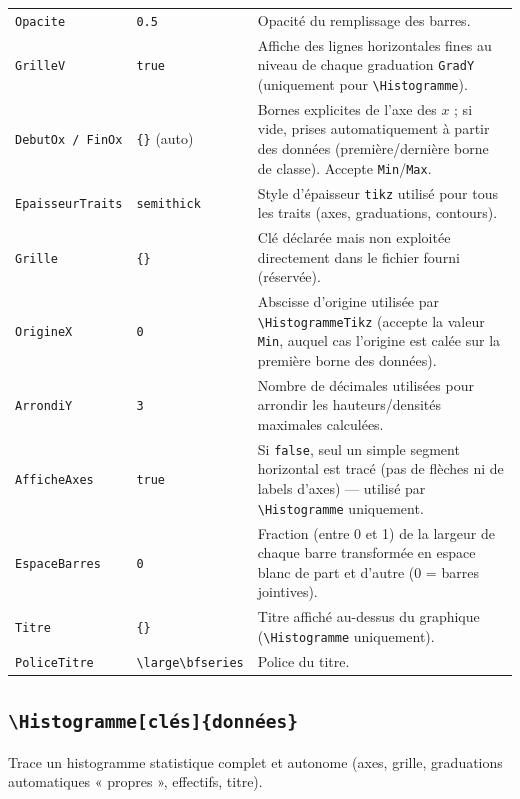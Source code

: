 \documentclass[11pt,a4paper]{article}
\newcommand{\cmdname}[1]{\texttt{\textbackslash#1}}
\begin{document}
\begin{longtable}{@{}p{3.6cm}p{3cm}p{7cm}@{}}
\texttt{Opacite} & \texttt{0.5} & Opacité du remplissage des barres. \\[3pt]
\texttt{GrilleV} & \texttt{true} & Affiche des lignes horizontales fines au niveau de chaque graduation \texttt{GradY} (uniquement pour \cmdname{Histogramme}). \\[3pt]
\texttt{DebutOx / FinOx} & \texttt{\{\}} (auto) & Bornes explicites de l'axe des $x$ ; si vide, prises automatiquement à partir des données (première/dernière borne de classe). Accepte \texttt{Min}/\texttt{Max}. \\[3pt]
\texttt{EpaisseurTraits} & \texttt{semithick} & Style d'épaisseur \texttt{tikz} utilisé pour tous les traits (axes, graduations, contours). \\[3pt]
\texttt{Grille} & \texttt{\{\}} & Clé déclarée mais non exploitée directement dans le fichier fourni (réservée). \\[3pt]
\texttt{OrigineX} & \texttt{0} & Abscisse d'origine utilisée par \cmdname{HistogrammeTikz} (accepte la valeur \texttt{Min}, auquel cas l'origine est calée sur la première borne des données). \\[3pt]
\texttt{ArrondiY} & \texttt{3} & Nombre de décimales utilisées pour arrondir les hauteurs/densités maximales calculées. \\[3pt]
\texttt{AfficheAxes} & \texttt{true} & Si \texttt{false}, seul un simple segment horizontal est tracé (pas de flèches ni de labels d'axes) — utilisé par \cmdname{Histogramme} uniquement. \\[3pt]
\texttt{EspaceBarres} & \texttt{0} & Fraction (entre 0 et 1) de la largeur de chaque barre transformée en espace blanc de part et d'autre (0 = barres jointives). \\[3pt]
\texttt{Titre} & \texttt{\{\}} & Titre affiché au-dessus du graphique (\cmdname{Histogramme} uniquement). \\[3pt]
\texttt{PoliceTitre} & \texttt{\textbackslash large\textbackslash bfseries} & Police du titre. \\
\bottomrule
\end{longtable}

\subsection{\cmdname{Histogramme[clés]\{données\}}}

Trace un histogramme statistique complet et autonome (axes, grille, graduations automatiques « propres », effectifs, titre).
\end{document}
